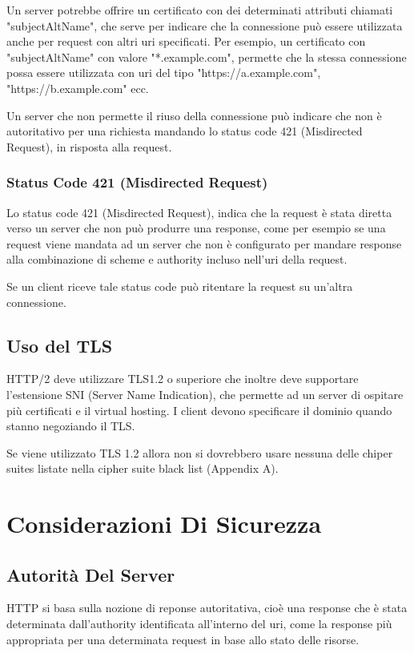 \documentclass[12pt, a4paper]{article} %
\begin{document}
Un server potrebbe offrire un certificato con dei determinati attributi chiamati "subjectAltName", che serve per indicare che la connessione può essere utilizzata anche per request con altri uri specificati.
Per esempio, un certificato con "subjectAltName" con valore "*.example.com", permette che la stessa connessione possa essere utilizzata con uri del tipo "https://a.example.com", "https://b.example.com" ecc.

Un server che non permette il riuso della connessione può indicare che non è autoritativo per una richiesta mandando lo status code 421 (Misdirected Request), in risposta alla request.

\subsubsection{Status Code 421 (Misdirected Request)}
Lo status code 421 (Misdirected Request), indica che la request è stata diretta verso un server che non può produrre una response, come per esempio se una request viene mandata ad un server che non è configurato per mandare response alla combinazione di scheme e authority incluso nell'uri della request.

Se un client riceve tale status code può ritentare la request su un'altra connessione.

\subsection{Uso del TLS}
HTTP/2 deve utilizzare TLS1.2 o superiore che inoltre deve supportare l'estensione SNI (Server Name Indication), che permette ad un server di ospitare più certificati e il virtual hosting. I client devono specificare il dominio quando stanno negoziando il TLS.

Se viene utilizzato TLS 1.2 allora non si dovrebbero usare nessuna delle chiper suites listate nella cipher suite black list (Appendix A).

\section{Considerazioni Di Sicurezza}
\subsection{Autorità Del Server}
HTTP si basa sulla nozione di reponse autoritativa, cioè una response che è stata determinata dall'authority identificata all'interno del uri, come la response più appropriata per una determinata request in base allo stato delle risorse.
\end{document}
